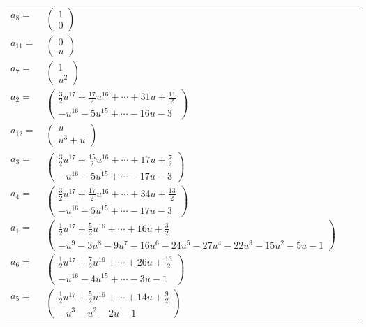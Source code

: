 \documentclass[1p]{elsarticle_modified}
\theoremstyle{definition}
\begin{document}
\begin{tabular}{m{7pt} m{180pt} m{7pt} m{180pt} }
\flushright $a_{8}=$&$\begin{pmatrix}1\\0\end{pmatrix}$ \\
\flushright $a_{11}=$&$\begin{pmatrix}0\\u\end{pmatrix}$ \\
\flushright $a_{7}=$&$\begin{pmatrix}1\\u^2\end{pmatrix}$ \\
\flushright $a_{2}=$&$\begin{pmatrix}\frac{3}{2} u^{17}+\frac{17}{2} u^{16}+\cdots+31 u+\frac{11}{2}\\- u^{16}-5 u^{15}+\cdots-16 u-3\end{pmatrix}$ \\
\flushright $a_{12}=$&$\begin{pmatrix}u\\u^3+u\end{pmatrix}$ \\
\flushright $a_{3}=$&$\begin{pmatrix}\frac{3}{2} u^{17}+\frac{15}{2} u^{16}+\cdots+17 u+\frac{7}{2}\\- u^{16}-5 u^{15}+\cdots-17 u-3\end{pmatrix}$ \\
\flushright $a_{4}=$&$\begin{pmatrix}\frac{3}{2} u^{17}+\frac{17}{2} u^{16}+\cdots+34 u+\frac{13}{2}\\- u^{16}-5 u^{15}+\cdots-17 u-3\end{pmatrix}$ \\
\flushright $a_{1}=$&$\begin{pmatrix}\frac{1}{2} u^{17}+\frac{5}{2} u^{16}+\cdots+16 u+\frac{3}{2}\\- u^9-3 u^8-9 u^7-16 u^6-24 u^5-27 u^4-22 u^3-15 u^2-5 u-1\end{pmatrix}$ \\
\flushright $a_{6}=$&$\begin{pmatrix}\frac{1}{2} u^{17}+\frac{7}{2} u^{16}+\cdots+26 u+\frac{13}{2}\\- u^{16}-4 u^{15}+\cdots-3 u-1\end{pmatrix}$ \\
\flushright $a_{5}=$&$\begin{pmatrix}\frac{1}{2} u^{17}+\frac{5}{2} u^{16}+\cdots+14 u+\frac{9}{2}\\- u^3- u^2-2 u-1\end{pmatrix}$ \\

\end{tabular}
\end{document}
